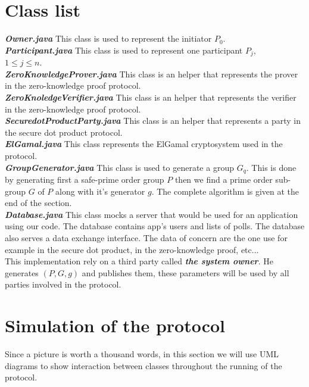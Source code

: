 \documentclass[11pt, a4paper, oneside, openright]{book} %
\begin{document}
\section{Class list}
\textbf{\textit{Owner.java}}
 This class is used to represent the initiator $P_0$.\\
\textbf{ \textit{Participant.java}}
 This class is used to represent one participant $P_j$, \\$1 \leq j \leq n$.\\
\textit{\textbf{ZeroKnowledgeProver.java}}
 This class is an helper that represents the prover in the zero-knowledge proof protocol.\\  
\textbf{\textit{ZeroKnoledgeVerifier.java}}
This class is an helper that represents the verifier in the zero-knowledge proof protocol.\\
\textbf{\textit{SecuredotProductParty.java}}
This class is an helper that represents a party in the secure dot product protocol.\\
\textbf{\textit{ElGamal.java}}
This class represents the ElGamal cryptosystem used in the protocol.\\
\textbf{\textit{GroupGenerator.java}} This class is used to generate a group $G_q$. This is done by generating first a safe-prime order group $P$ then we find a prime order sub-group $G$ of $P$ along with it's generator $g$. The complete algorithm is given at the end of the section.\\
\textbf{\textit{Database.java}}
This class mocks a server that would be used for an application using our code. The database contains app's users and lists of polls. The database also serves a data exchange interface. The data of concern are the one use for example in the secure dot product, in the zero-knowledge proof, etc...\\

This implementation rely on a third party called \textbf{\textit{the system owner}}. He generates $(P, G, g)$ and publishes them, these parameters will be used by all parties involved in the protocol.

\section{Simulation of the protocol}
Since a picture is worth a thousand words, in this section we will use UML diagrams to show interaction between classes throughout the running of the protocol.
\end{document}
